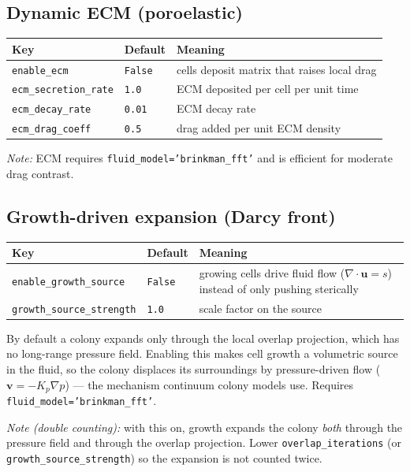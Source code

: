\documentclass[11pt]{article}
\newcommand{\code}[1]{\texttt{#1}}
\begin{document}
\subsection{Dynamic ECM (poroelastic)}
\begin{longtable}{p{} p{} p{}}
\toprule
Key & Default & Meaning \\ \midrule \endhead
\code{enable\_ecm} & \code{False} & cells deposit matrix that raises local drag \\
\code{ecm\_secretion\_rate} & \code{1.0} & ECM deposited per cell per unit time \\
\code{ecm\_decay\_rate} & \code{0.01} & ECM decay rate \\
\code{ecm\_drag\_coeff} & \code{0.5} & drag added per unit ECM density \\
\bottomrule
\end{longtable}
\emph{Note:} ECM requires \code{fluid\_model='brinkman\_fft'} and is efficient
for moderate drag contrast.

\subsection{Growth-driven expansion (Darcy front)}
\begin{longtable}{p{} p{} p{}}
\toprule
Key & Default & Meaning \\ \midrule \endhead
\code{enable\_growth\_source} & \code{False} & growing cells drive fluid flow
  ($\nabla\cdot\mathbf{u} = s$) instead of only pushing sterically \\
\code{growth\_source\_strength} & \code{1.0} & scale factor on the source \\
\bottomrule
\end{longtable}
By default a colony expands only through the local overlap projection, which has
no long-range pressure field. Enabling this makes cell growth a volumetric source
in the fluid, so the colony displaces its surroundings by pressure-driven flow
($\mathbf{v}=-K_p\nabla p$) --- the mechanism continuum colony models use.
Requires \code{fluid\_model='brinkman\_fft'}.

\emph{Note (double counting):} with this on, growth expands the colony
\emph{both} through the pressure field and through the overlap projection. Lower
\code{overlap\_iterations} (or \code{growth\_source\_strength}) so the expansion
is not counted twice.
\end{document}
